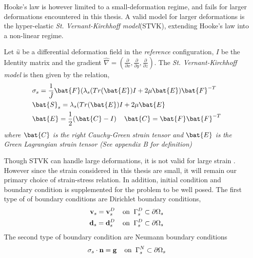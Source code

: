 Hooke's law is however limited to a small-deformation regime, and fails for larger deformations encountered in this thesis. A valid model for larger deformations is the  hyper-elastic \textit{St. \@ Vernant-Kirchhoff model}(STVK), 
extending Hooke's law into a non-linear regime.
 \begin{defn}
Let $\hat{u}$ be a differential deformation field in the \textit{reference} configuration, $I$ be the Identity matrix and the gradient $\hat{\nabla} = (\frac{\partial}{\partial x}, \frac{\partial}{\partial y}, \frac{\partial}{\partial z}) $. The \textit{St. Vernant-Kirchhoff model} is then given by the relation,
\begin{align*}
&\sigma_s = \frac{1}{\hat{J}} \bat{F}(\lambda_s(Tr(\bat{E}) I + 2 \mu \bat{E})\bat{F}^{-T} \\
&\bat{S}_s = \lambda_s(Tr(\bat{E}) I + 2 \mu \bat{E} \\
&\bat{E} = \frac{1}{2}(\bat{C} - I ) \hspace{4mm} \bat{C} = \bat{F}\bat{F}^{-T}
\end{align*} 
\textit{where $\bat{C}$ is the right Cauchy-Green strain tensor and $\bat{E}$ is the Green Lagrangian strain tensor
(See appendix B for definition)}
\end{defn}
  
Though STVK can handle large deformations, it is not valid for large strain \cite{Razzaq2010}. However since the strain considered in this thesis are small, it will remain our primary choice of strain-stress relation.
In addition, initial condition and boundary condition is supplemented for the problem to be well posed. The first type of of boundary conditions are Dirichlet boundary conditions, 
\begin{align}
\mathbf{v}_s = \mathbf{v}_s^D 
\hspace{4mm} \text{on} \hspace{2mm} \Gamma_s^D \subset \partial \Omega_s  \\
\mathbf{d}_s = \mathbf{d}_s^D 
\hspace{4mm} \text{on} \hspace{2mm} \Gamma_s^D \subset \partial \Omega_s  \\
\end{align}
The second type of boundary condition are Neumann boundary conditions
\begin{align}
\sigma_s \cdot \mathbf{n} = \mathbf{g}  
\hspace{4mm} \text{on} \hspace{2mm} \Gamma_s^N \subset \partial \Omega_s 
\end{align}
 \newpage
